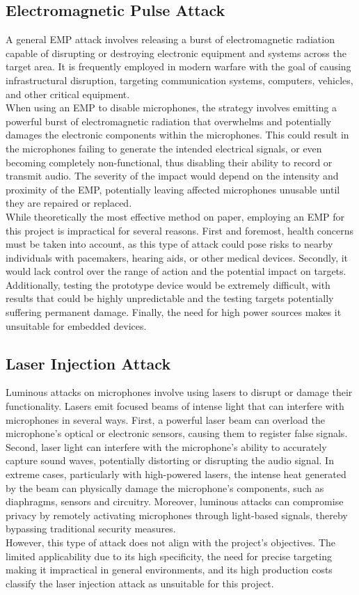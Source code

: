 \subsection{Electromagnetic Pulse Attack}
A general EMP attack involves releasing a burst of electromagnetic radiation capable of disrupting or destroying electronic equipment and systems across the target area.
It is frequently employed in modern warfare with the goal of causing infrastructural disruption, targeting communication systems, computers, vehicles, and other critical equipment.\\
When using an EMP to disable microphones, the strategy involves emitting a powerful burst of electromagnetic radiation that overwhelms and potentially damages the electronic components within the microphones.
This could result in the microphones failing to generate the intended electrical signals, or even becoming completely non-functional, thus disabling their ability to record or transmit audio.
The severity of the impact would depend on the intensity and proximity of the EMP, potentially leaving affected microphones unusable until they are repaired or replaced.\\
While theoretically the most effective method on paper, employing an EMP for this project is impractical for several reasons.
First and foremost, health concerns must be taken into account, as this type of attack could pose risks to nearby individuals with pacemakers, hearing aids, or other medical devices.
Secondly, it would lack control over the range of action and the potential impact on targets.
Additionally, testing the prototype device would be extremely difficult, with results that could be highly unpredictable and the testing targets potentially suffering permanent damage.
Finally, the need for high power sources makes it unsuitable for embedded devices.
\subsection{Laser Injection Attack}
Luminous attacks on microphones involve using lasers to disrupt or damage their functionality.
Lasers emit focused beams of intense light that can interfere with microphones in several ways.
First, a powerful laser beam can overload the microphone's optical or electronic sensors, causing them to register false signals.
Second, laser light can interfere with the microphone's ability to accurately capture sound waves, potentially distorting or disrupting the audio signal.
In extreme cases, particularly with high-powered lasers, the intense heat generated by the beam can physically damage the microphone's components, such as diaphragms, sensors and circuitry.
Moreover, luminous attacks can compromise privacy by remotely activating microphones through light-based signals, thereby bypassing traditional security measures. \\
However, this type of attack does not align with the project's objectives.
The limited applicability due to its high specificity, the need for precise targeting making it impractical in general environments, and its high production costs classify the laser injection attack as unsuitable for this project.
